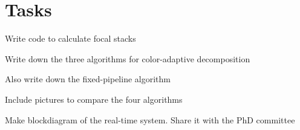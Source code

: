 \section{Tasks}
\begin{compact_todolist}
\item Write code to calculate focal stacks
\item Write down the three algorithms for color-adaptive decomposition
\item Also write down the fixed-pipeline algorithm
\item Include pictures to compare the four algorithms
\item Make blockdiagram of the real-time system. Share it with the PhD committee
\end{compact_todolist}